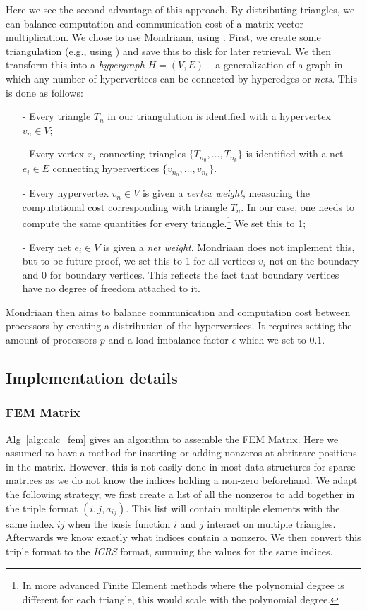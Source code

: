 \documentclass[11pt]{amsart}
\theoremstyle{definition}
\begin{document}
Here we see the second advantage of this approach. By distributing triangles, we can balance computation and communication cost of a matrix-vector multiplication. We chose to use Mondriaan, using \cite{bissmondriaan,biss2012}. First, we create some triangulation (e.g., using \cite{TODOJAN}) and save this to disk for later retrieval. We then transform this into a \emph{hypergraph} $H = (V,E)$ -- a generalization of a graph in which any number of hypervertices can be connected by hyperedges or \emph{nets}. This is done as follows:
\begin{itemize}
  \item[-] Every triangle $T_n$ in our triangulation is identified with a hypervertex $v_n \in V$;
  \item[-] Every vertex $x_i$ connecting triangles $\{T_{n_0}, \ldots, T_{n_k}\}$ is identified with a net $e_i \in E$ connecting hypervertices $\{v_{n_0}, \ldots, v_{n_k}\}$.
  \item[-] Every hypervertex $v_n \in V$ is given a \emph{vertex weight}, measuring the computational cost corresponding with triangle $T_n$. In our case, one needs to compute the same quantities for every triangle.\footnote{In more advanced Finite Element methods where the polynomial degree is different for each triangle, this would scale with the polynomial degree.} We set this to 1;
  \item[-] Every net $e_i\in V$ is given a \emph{net weight}. Mondriaan does not implement this, but to be future-proof, we set this to 1 for all vertices $v_i$ not on the boundary and 0 for boundary vertices. This reflects the fact that boundary vertices have no degree of freedom attached to it.
\end{itemize}
Mondriaan then aims to balance communication and computation cost between processors by creating a distribution of the hypervertices. It requires setting the amount of processors $p$ and a load imbalance factor $\epsilon$ which we set to $0.1$.

\subsection{Implementation details}
\subsubsection{FEM Matrix}
Alg~\ref{alg:calc_fem} gives an algorithm to assemble the FEM Matrix. Here
we assumed to have a method for inserting or adding nonzeros at abritrare positions in the matrix. However,
this is not easily done in most data structures for sparse matrices as we do not know the
indices holding a non-zero beforehand. We adapt the following strategy, we first create a list
of all the nonzeros to add together in the triple format $(i,j,a_{ij})$.
This list will contain multiple elements with the same index $ij$ when
the basis function $i$ and $j$ interact on multiple triangles. Afterwards we know
exactly what indices contain a nonzero. We then convert this triple format to the \emph{ICRS}
\cite[p.~171]{biss04} format, summing the values for the same indices.
\end{document}

